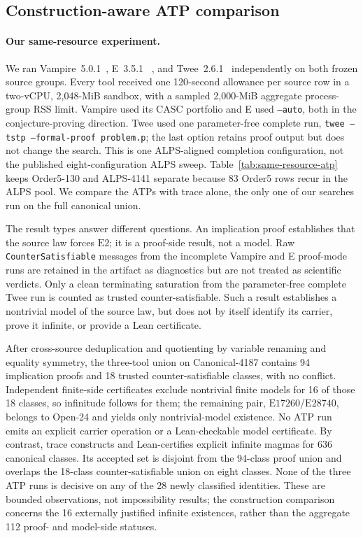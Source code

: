 \documentclass[runningheads]{llncs}
\newcommand{\Law}[1]{\ensuremath{\mathrm{E}#1}}
\begin{document}
\subsection{Construction-aware ATP comparison}

\paragraph{Our same-resource experiment.}
We ran Vampire~5.0.1~\cite{KovacsVoronkov2013}, E~3.5.1
~\cite{Schulz2002}, and Twee~2.6.1~\cite{Smallbone2021} independently on both
frozen source groups.  Every tool received one 120-second allowance per source
row in a two-vCPU, 2,048-MiB sandbox, with a sampled 2,000-MiB aggregate
process-group RSS limit.  Vampire used its CASC portfolio and E used
\texttt{--auto}, both in the conjecture-proving direction.  Twee used one
parameter-free complete run, \texttt{twee --tstp --formal-proof problem.p}; the
last option retains proof output but does not change the search.  This is one
ALPS-aligned completion configuration, not the published eight-configuration
ALPS sweep.  Table~\ref{tab:same-resource-atp} keeps Order5-130 and ALPS-4141
separate because 83 Order5 rows recur in the ALPS pool.  We compare the ATPs
with trace alone, the only one of our searches run on the full canonical union.



The result types answer different questions.  An implication proof establishes
that the source law forces \Law{2}; it is a proof-side result, not a model.
Raw \texttt{CounterSatisfiable} messages from the incomplete Vampire and E
proof-mode runs are retained in the artifact as diagnostics but are not treated
as scientific verdicts.  Only a clean terminating saturation from the
parameter-free complete Twee run is counted as trusted counter-satisfiable.
Such a result establishes a nontrivial model of the source law, but does not by
itself identify its carrier, prove it infinite, or provide a Lean certificate.

After cross-source deduplication and quotienting by variable renaming and
equality symmetry, the three-tool union on Canonical-4187 contains 94
implication proofs and 18 trusted counter-satisfiable classes, with no conflict.
Independent finite-side certificates exclude nontrivial finite models for 16
of those 18 classes, so infinitude follows for them; the remaining pair,
\Law{17260}/\Law{28740}, belongs to Open-24 and yields only nontrivial-model
existence.  No ATP run emits an explicit carrier operation or a Lean-checkable
model certificate.  By contrast, trace constructs and Lean-certifies explicit
infinite magmas for 636 canonical classes.  Its accepted set is disjoint from
the 94-class proof union and overlaps the 18-class counter-satisfiable union on
eight classes.  None of the three ATP runs is decisive on any of the 28 newly
classified identities.  These are bounded observations, not impossibility
results; the construction comparison concerns the 16 externally justified
infinite existences, rather than the aggregate 112 proof- and model-side
statuses.
\end{document}
